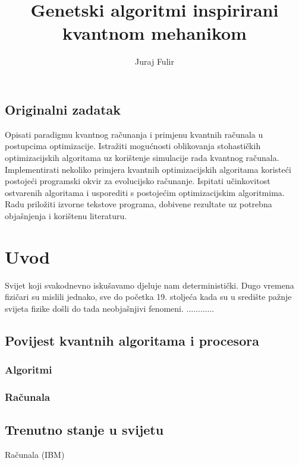\documentclass[times, utf8, zavrsni]{fer}
\title{Genetski algoritmi inspirirani kvantnom mehanikom}
\author{Juraj Fulir}
\begin{document}
\maketitle
\section{Originalni zadatak}
Opisati paradigmu kvantnog računanja i primjenu kvantnih računala u postupcima optimizacije. Istražiti mogućnosti oblikovanja stohastičkih optimizacijskih algoritama uz korištenje simulacije rada kvantnog računala. Implementirati nekoliko primjera kvantnih optimizacijskih algoritama koristeći postojeći programski okvir za evolucijsko računanje. Ispitati učinkovitost ostvarenih algoritama i usporediti s postojećim optimizacijskim algoritmima. Radu priložiti izvorne tekstove programa, dobivene rezultate uz potrebna objašnjenja i korištenu literaturu.

\newpage


\tableofcontents


\chapter{Uvod}
Svijet koji svakodnevno iskušavamo djeluje nam deterministički.
Dugo vremena fizičari su mislili jednako, sve do početka 19. stoljeća kada su u središte pažnje svijeta fizike došli do tada neobjašnjivi fenomeni.  ............
\section{Povijest kvantnih algoritama i procesora}
\subsection{Algoritmi}
\subsection{Računala}
\section{Trenutno stanje u svijetu}
Računala (IBM)
\end{document}
